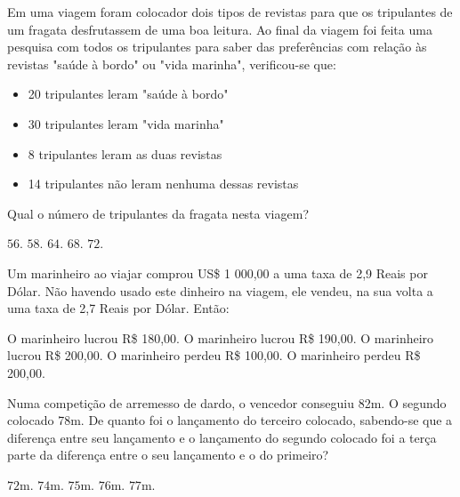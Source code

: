 \begin{question}%
Em uma viagem foram colocador dois tipos de revistas para que os tripulantes de um fragata desfrutassem de uma boa leitura. Ao final da viagem foi feita uma pesquisa com todos os tripulantes para saber das preferências com relação às revistas "saúde à bordo" ou "vida marinha", verificou-se que:

\begin{itemize}
    \item 20 tripulantes leram "saúde à bordo"
    \item 30 tripulantes leram "vida marinha"
    \item 8 tripulantes leram as duas revistas
    \item 14 tripulantes não leram nenhuma dessas revistas
\end{itemize}
Qual o número de tripulantes da fragata nesta viagem?
    \begin{tasks}
        \task \(56\).
        \task \(58\).
        \task \(64\).
        \task \(68\).
        \task \(72\).
    \end{tasks}
\end{question}

\begin{question}%
Um marinheiro ao viajar comprou US\$ 1 000,00 a uma taxa de 2,9 Reais por Dólar. Não havendo usado este dinheiro na viagem, ele vendeu, na sua volta a uma taxa de 2,7 Reais por Dólar. Então:
    \begin{tasks}
        \task O marinheiro lucrou R\$ 180,00.
        \task O marinheiro lucrou R\$ 190,00.
        \task O marinheiro lucrou R\$ 200,00.
        \task O marinheiro perdeu R\$ 100,00.
        \task O marinheiro perdeu R\$ 200,00.
    \end{tasks}
\end{question}

\begin{question}%
Numa competição de arremesso de dardo, o vencedor conseguiu 82m. O segundo colocado 78m. De quanto foi o lançamento do terceiro colocado, sabendo-se que a diferença entre seu lançamento e o lançamento do segundo colocado foi a terça parte da diferença entre o seu lançamento e o do primeiro?
    \begin{tasks}
        \task \(72\)m.
        \task \(74\)m.
        \task \(75\)m.
        \task \(76\)m.
        \task \(77\)m.
    \end{tasks}
\end{question}

